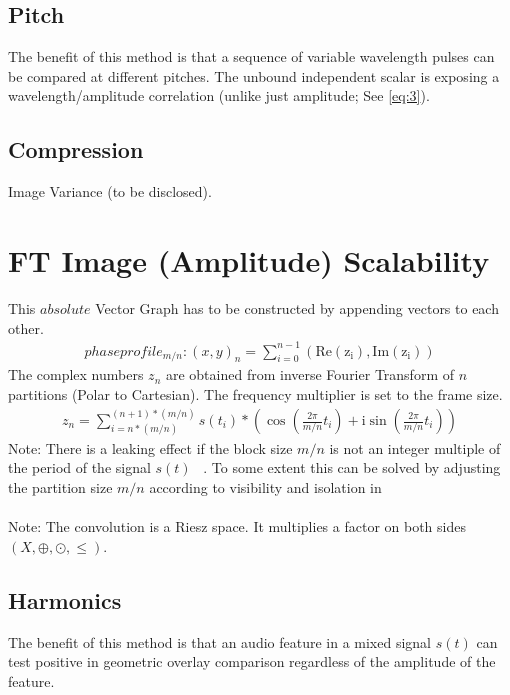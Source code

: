\documentclass{report}
\begin{document}
\subsection{Pitch}
The benefit of this method is that a sequence of variable wavelength pulses can be compared at different pitches. The unbound independent scalar is exposing a wavelength/amplitude correlation (unlike just amplitude; See \eqref{eq:3}).
\subsection{Compression}
Image Variance (to be disclosed).
\section{FT Image (Amplitude) Scalability}
This $absolute$ Vector Graph has to be constructed by appending vectors to each other.
\begin{align}
phaseprofile_{m/n}: (x,y)_{n}=\sum \limits _{i=0}^{n-1}(\mathrm{Re(z_{i})},\mathrm{Im(z_{i})})
\end{align}
The complex numbers $z_{n}$ are obtained from inverse Fourier Transform of $n$ partitions (Polar to Cartesian). The frequency multiplier is set to the frame size.
\begin{align}
z_{n}= \sum \limits _{i=n*(m/n)}^{(n+1)*(m/n)} s(t_{i})*(\cos(\frac{2\pi}{m/n}t_{i})+\mathrm{i}\sin(\frac{2\pi}{m/n}t_{i}))\label{eq:3}
\end{align}
Note: There is a leaking effect if the block size $m/n$ is not an integer multiple of the period of the signal $s(t)$ ~\cite[Fensterfunktion]{Fensterfunktion}. To some extent this can be solved by adjusting the partition size $m/n$ according to visibility and isolation in ~\cite[Stopeight\_Comparator.tex]{Comparator}\\\\
Note: The convolution is a Riesz space. It multiplies a factor on both sides $(X,\oplus,\odot,\leq)$.
\subsection{Harmonics}
The benefit of this method is that an audio feature in a mixed signal $s(t)$ can test positive in geometric overlay comparison regardless of the amplitude of the feature.

\iffalse
\printbibliography
\fi
{}

\end{document}
